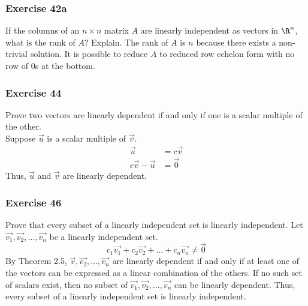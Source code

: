 \documentclass[letterpaper, 12pt]{math}
\begin{document}
\subsubsection*{Exercise 42a}
If the columns of an \( n\times n \) matrix \( A \) are linearly independent
as vectors in \( \R^n \), what is the rank of \( A \)? Explain.
The rank of \( A \) is \( n \) because there exists a non-trivial solution. It
is possible to reduce \( A \) to reduced row echelon form with no row of 0s
at the bottom.

\subsubsection*{Exercise 44}
Prove two vectors are linearly dependent if and only if one is a scalar multiple
of the other. \\
Suppose \( \vec{u} \) is a scalar multiple of \( \vec{v} \).
\begin{align*}
  \vec{u} &= c\vec{v} \\
  c\vec{v}-\vec{u} &= \vec{0}
\end{align*}
Thus, \( \vec{u} \) and \( \vec{v} \) are linearly dependent.

\subsubsection*{Exercise 46}
Prove that every subset of a linearly independent set is linearly independent.
Let \( \vec{v_1},\vec{v_2},\dots,\vec{v_n} \) be a linearly independent set.
\[ c_1\vec{v_1}+c_2\vec{v_2}+\dots+c_n\vec{v_n} \ne \vec{0} \]
By Theorem 2.5, \( \vec{v},\vec{v_2},\dots,\vec{v_n} \) are linearly dependent
if and only if at least one of the vectors can be expressed as a linear
combination of the others. If no such set of scalars exist, then no subset
of \( \vec{v_1},\vec{v_2},\dots,\vec{v_n} \) can be linearly dependent. Thus,
every subset of a linearly independent set is linearly independent.
\end{document}
